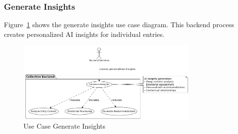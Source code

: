 \subsubsection{Generate Insights}

Figure~\ref{fig:usecase-generate-insights} shows the generate insights use case diagram. This backend process creates personalized AI insights for individual entries.

\begin{figure}[H]
\centering
\includegraphics[width=0.8\textwidth]{files/imgs/usecase_U9ojKijkmZ.png}
\caption{Use Case Generate Insights}
\label{fig:usecase-generate-insights}
\end{figure}

